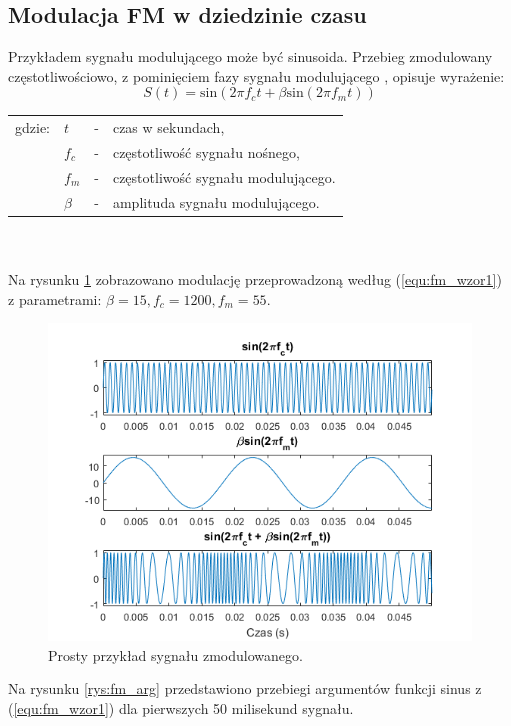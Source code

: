 \subsection{Modulacja FM w dziedzinie czasu}
Przykładem sygnału modulującego może być sinusoida. Przebieg zmodulowany częstotliwościowo, z pominięciem fazy sygnału modulującego \cite{oland}, opisuje wyrażenie:
\begin{equation} \label{equ:fm_wzor1}
S(t)= \text{sin}(2 \pi f_c t + \beta \text{sin}(2 \pi f_m t))
\end{equation}
\begin{tabular}{ l l l l}
	gdzie: & $t$ &  - & czas w sekundach, \\
	&	$f_c$ & - &  częstotliwość sygnału nośnego,\\
	&	$f_m$ & - &  częstotliwość sygnału modulującego.\\
	&	$\beta$ & - & amplituda sygnału modulującego.\\
\end{tabular} \\ \\
Na rysunku \ref{rys:fm_wykres1} zobrazowano modulację przeprowadzoną według (\ref{equ:fm_wzor1}) z parametrami: $\beta = 15, f_c = 1200, f_m = 55$.
\begin{figure}[H]
	\centering
	\includegraphics[width=12cm]{grafiki/fm_wykres1}
	\captionsetup{justification=centering}
	\caption{Prosty przykład sygnału zmodulowanego.}
	\label{rys:fm_wykres1}
\end{figure}
Na rysunku \ref{rys:fm_arg} przedstawiono przebiegi argumentów funkcji sinus z (\ref{equ:fm_wzor1}) dla pierwszych 50 milisekund sygnału.
